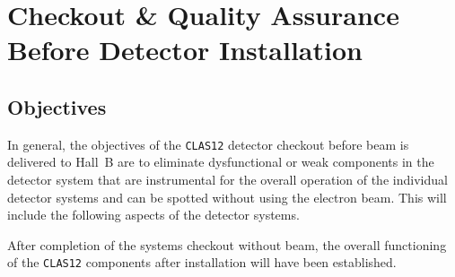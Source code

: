 \section{Checkout \& Quality Assurance Before Detector Installation} 

\subsection{Objectives}

In general, the objectives of the {\tt CLAS12} detector checkout before beam
is delivered to Hall~B are to eliminate dysfunctional or weak components
in the detector system that are instrumental for the overall operation of
the individual detector systems and can be spotted without using the
electron beam.  This will include the following aspects of the detector
systems.

After completion of the systems checkout without beam, the overall
functioning of the {\tt CLAS12} components after installation will have been
established.

